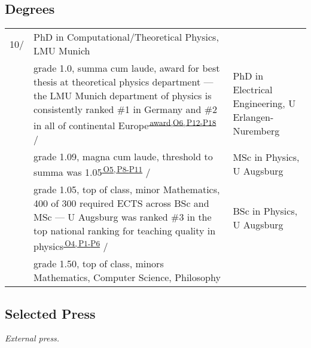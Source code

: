 \newpage
\subsection*{Degrees}\vspace{-1em}

\begin{longtable}[t]{R{\widthC} p{\widthB}}
10/
&PhD in Computational/Theoretical Physics, LMU Munich\\ 
&{\footnotesize grade 1.0, summa cum laude, award for best thesis at theoretical physics department --- the LMU Munich department of physics is consistently ranked \#1 in Germany and \#2 in all of continental Europe\textsuperscript{\hyperlink{phdprize}{\,award,}}\textsuperscript{\hyperlink{O6}{O6,\,}\hyperlink{P12}{P12-}\hyperlink{P18}{P18}}}
/
&PhD in Electrical Engineering, U Erlangen-Nuremberg\\ 
&{\footnotesize grade 1.09, magna cum laude, threshold to summa was 1.05\textsuperscript{\hyperlink{O5}{\,O5,\,}\hyperlink{P8}{P8-}\hyperlink{P11}{P11}}}
/
& MSc in Physics, U Augsburg\\ 
&{\footnotesize grade 1.05, top of class,  
minor Mathematics, 400 of 300 required ECTS across BSc and MSc --- U Augsburg was ranked \#3 in the top national ranking for teaching quality in physics\textsuperscript{\hyperlink{O4}{\,O4,\,}\hyperlink{P1}{P1-}\hyperlink{P6}{P6}}}%
/ 
& BSc in Physics, U Augsburg\\
&{\footnotesize grade 1.50, top of class,
minors Mathematics, Computer Science, Philosophy}
\end{longtable}

\subsection*{Selected Press }

\noindent \textit{External press.}

